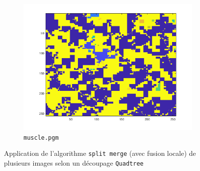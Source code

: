 \documentclass[a4paper]{article}
\begin{document}
\begin{figure}[H]
\begin{subfigure}[c]{0.6\textwidth}
        \centering
        \includegraphics[width=\textwidth]{images/ex2_muscle.png}
        \caption{\texttt{muscle.pgm}}
    \label{subfig:ex2muscle}
    \end{subfigure}

    \caption{Application de l'algorithme \texttt{split merge} (avec fusion locale) de plusieurs
    images selon un découpage \texttt{Quadtree}}
    \label{fig:ex2}


\end{figure}
\end{document}
